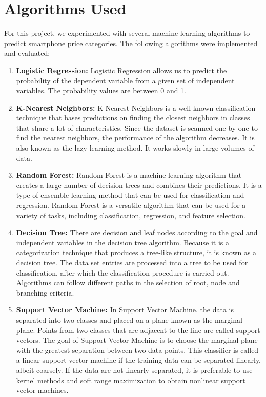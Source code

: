 \documentclass[12pt]{report}
\begin{document}
\section{Algorithms Used}
For this project, we experimented with several machine learning algorithms to predict smartphone price categories. The following algorithms were implemented and evaluated:
\vspace{-1.25em}
\begin{enumerate}
	\setlength\itemsep{-1.05em}
	
	\item{\textbf{Logistic Regression: }}Logistic Regression allows us to predict the probability of the dependent variable from a given set of independent variables. The probability values are between 0 and 1. \cite{hadsonml}
	\item{\textbf{K-Nearest Neighbors: }}
	K-Nearest Neighbors is a well-known classification technique that bases predictions on finding the closest neighbors in classes that share a lot of characteristics. Since the dataset is scanned one by one to find the nearest neighbors, the performance of the algorithm decreases. It is also known as the lazy learning method. It works slowly in large volumes of data. \cite{hadsonml}
	\item{\textbf{Random Forest: }}Random Forest is a machine learning algorithm that creates a large number of decision trees and combines their predictions. It is a type of ensemble learning method that can be used for classification and regression. Random Forest is a versatile algorithm that can be used for a variety of tasks, including classification, regression, and feature selection. \cite{hadsonml}
	\item{\textbf{Decision Tree: }}There are decision and leaf nodes according to the goal and independent variables in the decision tree algorithm. Because it is a categorization technique that produces a tree-like structure, it is known as a decision tree. The data set entries are processed into a tree to be used for classification, after which the classification procedure is carried out. Algorithms can follow different paths in the selection of root, node and branching criteria. \cite{hadsonml}
	\item{\textbf{Support Vector Machine: }}In Support Vector Machine, the data is separated into two classes and placed on a plane known as the marginal plane. Points from two classes that are adjacent to the line are called support vectors. The goal of Support Vector Machine is to choose the marginal plane with the greatest separation between two data points. This classifier is called a linear support vector machine if the training data can be separated linearly, albeit coarsely. If the data are not linearly separated, it is preferable to use kernel methods and soft range maximization to obtain nonlinear support vector machines. \cite{hadsonml}

\end{enumerate}
\end{document}
